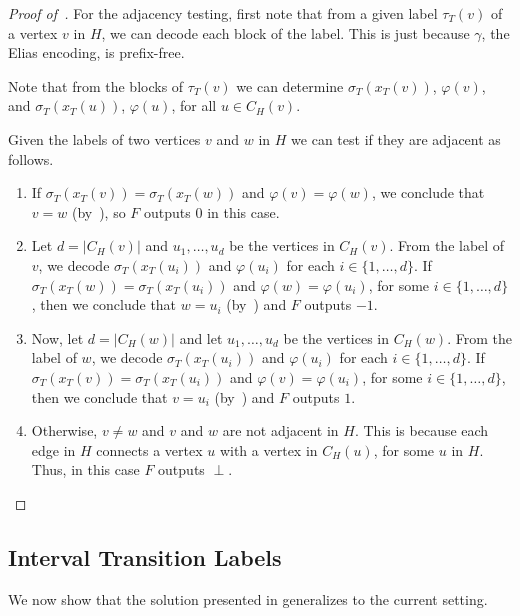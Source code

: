 \documentclass[kpfonts]{patmorin}
\begin{document}
\begin{proof}[Proof of~]
For the adjacency testing, first note that from a given label $\tau_T(v)$ of a vertex $v$ in $H$, we can decode each block of the label. 
This is just because $\gamma$, the Elias encoding, is prefix-free. 

Note that from the blocks of $\tau_T(v)$ we can determine $\sigma_T(x_T(v))$, $\varphi(v)$, and 
$\sigma_T(x_T(u))$, $\varphi(u)$, for all $u\in C_H(v)$.

Given the labels of two vertices $v$ and $w$ in $H$ we can test if they are adjacent as follows.
\begin{enumerate}
  \item If $\sigma_T(x_T(v)) = \sigma_T(x_T(w))$ and $\varphi(v)=\varphi(w)$, we conclude that $v=w$ (by~), so $F$ outputs $0$ in this case.
  \item Let $d=|C_H(v)|$ and $u_1,\ldots, u_d$ be the vertices in $C_H(v)$. 
  From the label of $v$, we decode $\sigma_T(x_T(u_i))$ and $\varphi(u_i)$ for each $i\in\{1,\ldots,d\}$.
  If $\sigma_T(x_T(w)) = \sigma_T(x_T(u_i))$ and $\varphi(w)=\varphi(u_i)$, for some $i\in\{1,\ldots,d\}$, then we conclude that $w=u_i$ (by~) and $F$ outputs $-1$.

  \item  Now, let $d=|C_H(w)|$ and let $u_1,\ldots, u_d$ be the vertices in $C_H(w)$. 
  From the label of $w$, we decode $\sigma_T(x_T(u_i))$ and $\varphi(u_i)$ for each $i\in\{1,\ldots,d\}$.
  If $\sigma_T(x_T(v)) = \sigma_T(x_T(u_i))$ and $\varphi(v)=\varphi(u_i)$, for some $i\in\{1,\ldots,d\}$, then we conclude that $v=u_i$ (by~) and $F$ outputs $1$.

  \item Otherwise, $v\neq w$ and $v$ and $w$ are not adjacent in $H$. 
  This is because each edge in $H$ connects a vertex $u$ with a vertex in $C_H(u)$, for some $u$ in $H$.
  Thus, in this case $F$ outputs $\perp$.
\end{enumerate}
\end{proof}

\subsection{Interval Transition Labels}

We now show that the solution presented in  generalizes to the current setting.

\end{document}
